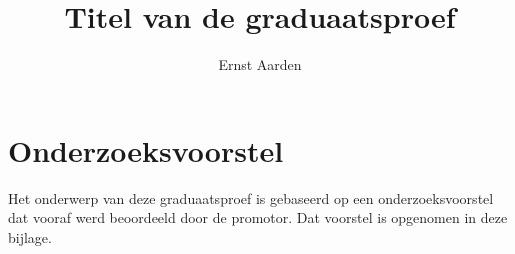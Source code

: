 \documentclass[dutch,dit,thesis]{hogentreport}
\author{Ernst Aarden}
\title[Optionele ondertitel]%
    {Titel van de graduaatsproef}
\begin{document}

\frontmatter

\hypersetup{pageanchor=false} %

\maketitle
\hypersetup{pageanchor=true}

\tableofcontents
\mainmatter{}













\appendix

\chapter{Onderzoeksvoorstel}

Het onderwerp van deze graduaatsproef is gebaseerd op een onderzoeksvoorstel dat vooraf werd beoordeeld door de promotor. Dat voorstel is opgenomen in deze bijlage.





%


\backmatter{}

\setlength\bibitemsep{2pt} %
\printbibliography[heading=bibintoc]
\end{document}

